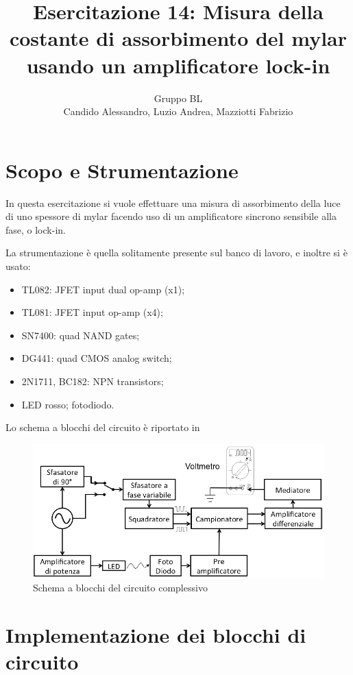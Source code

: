 \documentclass[a4paper,10pt]{article}
\title{Esercitazione 14: Misura della costante di assorbimento del mylar\\ usando un
	amplificatore lock-in}
\author{Gruppo BL \\ Candido Alessandro, Luzio Andrea, Mazziotti Fabrizio}
\begin{document}
\maketitle

\section{Scopo e Strumentazione}
In questa esercitazione si vuole effettuare una misura di assorbimento della luce di uno spessore di mylar facendo uso di un amplificatore sincrono sensibile alla fase, o lock-in.
\newline

\noindent La strumentazione è quella solitamente presente sul banco di lavoro, e inoltre si è usato:
\begin{itemize}
	\item TL082: JFET input dual op-amp (x1);
	\item TL081: JFET input op-amp (x4);
	\item SN7400: quad NAND gates;
	\item DG441: quad CMOS analog switch;
	\item 2N1711, BC182: NPN transistors;
	\item LED rosso; fotodiodo.
\end{itemize}

Lo schema a blocchi del circuito è riportato in 

\begin{figure}[H]
	\centering
	\includegraphics[width=\textwidth]{../grafici/Blocks.png}
	\caption{Schema a blocchi del circuito complessivo}
	\label{fig:blocks}
\end{figure}

\section{Implementazione dei blocchi di circuito}
\end{document}
